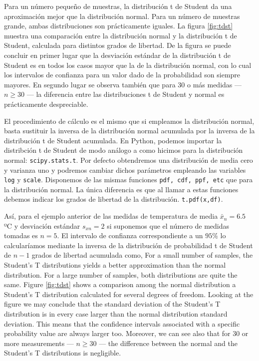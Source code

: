 \begin{paracol}{2}
Para un número pequeño de muestras, la distribución t de Student da una aproximación mejor que la distribución normal. Para un número de muestras grande, ambas distribuciones son prácticamente iguales.  La figura \ref{fig:tdst} muestra una comparación entre la distribución normal y la distribución t de Student, calculada para distintos grados de libertad. De la figura se puede concluir en primer lugar que la desviación estándar de la distribución t de Student es en todos los casos mayor que la de la distribución normal, con lo cual los intervalos de confianza para un valor dado de la probabilidad son siempre mayores. En segundo lugar se observa también que para 30 o más medidas --- $n\geqslant 30$ --- la diferencia entre las distribuciones t de Student y normal es prácticamente despreciable.

El procedimiento de cálculo es el mismo que si empleamos la distribución normal, basta sustituir la inversa de la distribución normal acumulada por la inversa de la distribución t de Student acumulada. En Python, podemos importar la distribción t de Student de modo análogo a como hicimos para la distribución normal: \texttt{scipy.stats.t}. Por defecto obtendremos una distribución de media cero y varianza uno y podremos cambiar dichos parámetros empleando las variables \texttt{log} y \texttt{scale}. Disponemos de las mismas funciones \texttt{pdf, cdf, ppf, etc} que para la distribución normal. La única diferencia es que al llamar a estas funciones debemos indicar los grados de libertad de la distribución. \texttt{t.pdf(x,df)}.

Así, para el ejemplo anterior de las medidas de temperatura de media  $\bar{x}_n=6.5$ ºC y  desviación estándar $s_{xn}=2$  si suponemos que el número de medidas tomadas es $n=5$. El intervalo de confianza correspondiente a un $95\%$  lo calcularíamos mediante la inversa de la distribución de probabilidad t de Student de $n-1$ grados de libertad acumulada como,
\switchcolumn
For a small number of samples, the Student's T distributions yields a better approximation than the normal distribution. For a large number of samples, both distributions are quite the same. Figure \ref{fig:tdst} shows a comparison among the normal distribution a Student's T distribution calculated for several degrees of freedom. Looking at the figure we may conclude that the standard deviation of the Student's T distribution is in every case larger than the normal distribution standard deviation. This means that the confidence intervals associated with a specific probability value are always larger too. Moreover, we can see also that for 30 or more measurements --- $n\geqslant 30$ --- the difference between the normal and the Student's T distributions is negligible.


\end{paracol}
